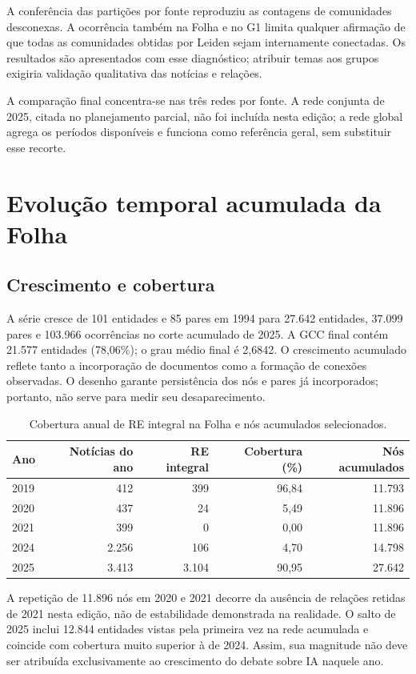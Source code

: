 \documentclass[11pt,a4paper]{article}
\begin{document}
A conferência das partições por fonte reproduziu as contagens de comunidades desconexas. A ocorrência também na Folha e no G1 limita qualquer afirmação de que todas as comunidades obtidas por Leiden sejam internamente conectadas. Os resultados são apresentados com esse diagnóstico; atribuir temas aos grupos exigiria validação qualitativa das notícias e relações.

A comparação final concentra-se nas três redes por fonte. A rede conjunta de 2025, citada no planejamento parcial, não foi incluída nesta edição; a rede global agrega os períodos disponíveis e funciona como referência geral, sem substituir esse recorte.

\clearpage
\section{Evolução temporal acumulada da Folha}
\subsection{Crescimento e cobertura}
A série cresce de 101 entidades e 85 pares em 1994 para 27.642 entidades, 37.099 pares e 103.966 ocorrências no corte acumulado de 2025. A GCC final contém 21.577 entidades (78,06\%); o grau médio final é 2,6842. O crescimento acumulado reflete tanto a incorporação de documentos como a formação de conexões observadas. O desenho garante persistência dos nós e pares já incorporados; portanto, não serve para medir seu desaparecimento.

\begin{table}[H]\centering\small
\caption{Cobertura anual de RE integral na Folha e nós acumulados selecionados.}\label{tab:cobertura}
\begin{tabular}{lrrrr}\toprule
Ano & Notícias do ano & RE integral & Cobertura (\%) & Nós acumulados\\\midrule
2019 & 412 & 399 & 96,84 & 11.793\\
2020 & 437 & 24 & 5,49 & 11.896\\
2021 & 399 & 0 & 0,00 & 11.896\\
2024 & 2.256 & 106 & 4,70 & 14.798\\
2025 & 3.413 & 3.104 & 90,95 & 27.642\\\bottomrule
\end{tabular}
\end{table}

A repetição de 11.896 nós em 2020 e 2021 decorre da ausência de relações retidas de 2021 nesta edição, não de estabilidade demonstrada na realidade. O salto de 2025 inclui 12.844 entidades vistas pela primeira vez na rede acumulada e coincide com cobertura muito superior à de 2024. Assim, sua magnitude não deve ser atribuída exclusivamente ao crescimento do debate sobre IA naquele ano.
\end{document}

